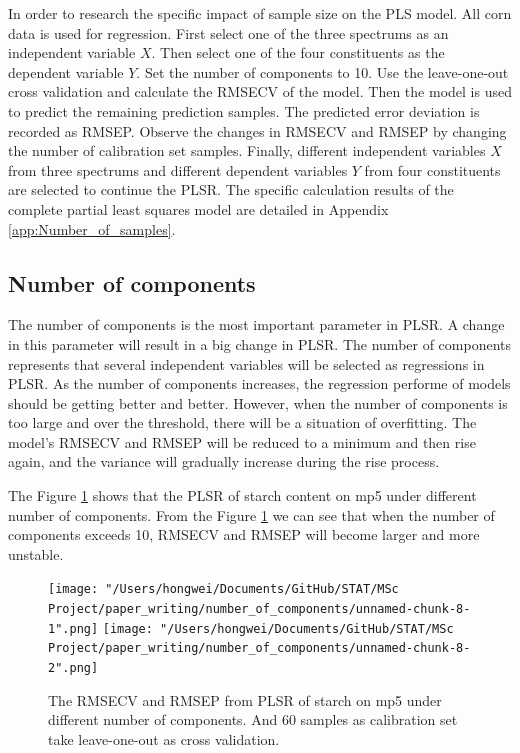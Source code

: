 \documentclass[a4paper,12pt,titlepage]{article} %
\numberwithin{equation}{section}  %
\begin{document}
	In order to research the specific impact of sample size on the PLS model. All corn data is used for regression.
	First select one of the three spectrums as an independent variable $X$. Then select one of the four constituents as the dependent variable $Y$. Set the number of components to 10. Use the leave-one-out cross validation and calculate the RMSECV of the model. Then the model is used to predict the remaining prediction samples. The predicted error deviation is recorded as RMSEP. Observe the changes in RMSECV and RMSEP by changing the number of calibration set samples. Finally, different independent variables $X$ from three spectrums and different dependent variables $Y$ from four constituents are selected to continue the PLSR. The specific calculation results of the complete partial least squares model are detailed in Appendix \ref{app:Number_of_samples}.
	
	\subsection{Number of components}
	\label{sec:Number of Components}
	
	The number of components is the most important parameter in PLSR. A change in this parameter will result in a big change in PLSR. The number of components represents that several independent variables will be selected as regressions in PLSR. As the number of components increases, the regression performe of models should be getting better and better. However, when the number of components is too large and over the threshold, there will be a situation of overfitting. The model's RMSECV and RMSEP will be reduced to a minimum and then rise again, and the variance will gradually increase during the rise process.
	
	The Figure \ref{fig:component_1} shows that the PLSR of starch content on mp5 under different number of components. From the Figure \ref{fig:component_1} we can see that when the number of components exceeds 10, RMSECV and RMSEP will become larger and more unstable.
	
		\begin{figure}[h]    %
		\centering           %
		\texttt{[image: "/Users/hongwei/Documents/GitHub/STAT/MSc Project/paper\_writing/number\_of\_components/unnamed-chunk-8-1".png]}  %
		\texttt{[image: "/Users/hongwei/Documents/GitHub/STAT/MSc Project/paper\_writing/number\_of\_components/unnamed-chunk-8-2".png]}  %
		\caption{The RMSECV and RMSEP from PLSR of starch on mp5 under different number of components. And 60 samples as calibration set take leave-one-out as cross validation.}          %
		\label{fig:component_1}               %
	\end{figure}                        %
	
\end{document}
